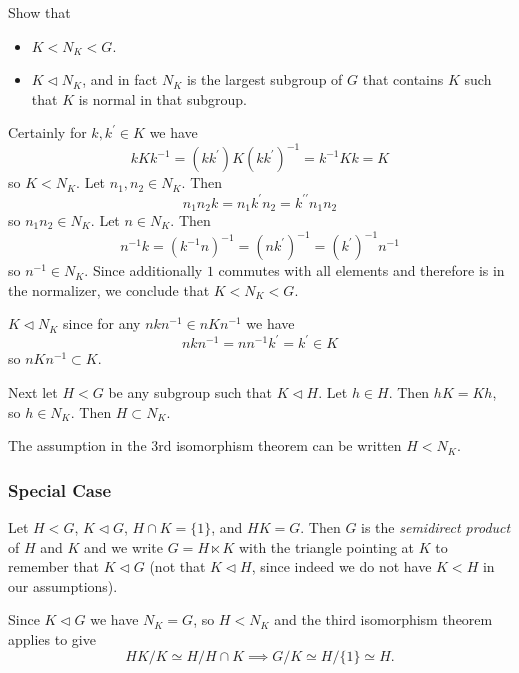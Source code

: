 \begin{Problem}
Show that
\begin{itemize}
  \item{$K < N_K < G$.}
  \item{$K \triangleleft N_K$, and in fact $N_K$ is the largest
      subgroup of $G$ that contains $K$ such that $K$ is normal in
      that subgroup.}
\end{itemize}
\end{Problem}

\begin{Answer}
Certainly for $k, k^\prime \in K$ we have
$$
k K k^{-1} = (k k^\prime)K(k k^\prime)^{-1} = k^{-1} K k = K
$$
so $K < N_K$. Let $n_1, n_2 \in N_K$. Then
$$
n_1 n_2 k = n_1 k^\prime n_2 = k^{\prime\prime} n_1 n_2
$$
so $n_1 n_2 \in N_K$. Let $n \in N_K$. Then
$$
n^{-1} k = (k^{-1} n)^{-1} = (n k^\prime)^{-1} = (k^\prime)^{-1} n^{-1}
$$
so $n^{-1} \in N_K$. Since additionally $1$ commutes with all elements
and therefore is in the normalizer, we conclude that $K < N_K < G$.

$K \triangleleft N_K$ since for any
$n k n^{-1} \in n K n^{-1}$ we have
$$
n k n^{-1} = n n^{-1} k^\prime = k^\prime \in K
$$
so $n K n^{-1} \subset K$.

Next let $H < G$ be any subgroup such that $K \triangleleft H$.
Let $h \in H$. Then $h K = K h$, so $h \in N_K$. Then
$H \subset N_K$.
\end{Answer}

\begin{remark}
The assumption in the 3rd isomorphism theorem can be written $H < N_K$.
\end{remark}

\subsubsection{Special Case}
\begin{defn}
Let $H < G$, $K \triangleleft G$, $H \cap K = \{ 1 \}$, and $HK = G$.
Then $G$ is the \emph{semidirect product} of $H$ and $K$ and we write
$G = H \ltimes K$ with the triangle pointing at $K$ to remember that
$K \triangleleft G$ (not that $K \triangleleft H$, since indeed we do
not have $K < H$ in our assumptions).

Since $K \triangleleft G$ we have $N_K = G$, so $H < N_K$ and
the third isomorphism theorem applies to give
$$
HK / K \simeq H / H \cap K \implies
G / K  \simeq H / \{ 1 \} \simeq H.
$$
\end{defn}

